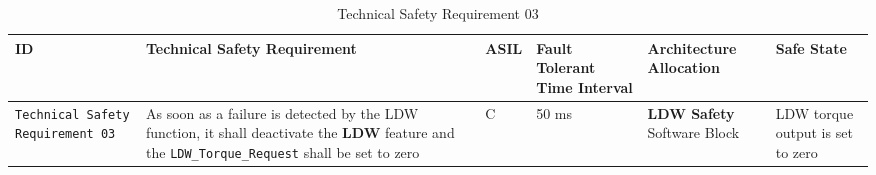 \begin{table}[!htpb]
\caption{Technical Safety Requirement 03}
\begin{center}
\scriptsize
\renewcommand{\arraystretch}{1.4}
\begin{tabular}{ L{1.8cm}|L{5.2cm}|L{0.7cm}|L{1.3cm}|L{1.8cm}|L{2.0cm}  }
\hline
{}
ID &
Technical Safety Requirement  &
ASIL &
Fault Tolerant Time Interval  &  
Architecture Allocation  &  
Safe State \\\hline
\textcolor{harmonia-blue}{\texttt{Technical Safety Requirement 03}}  &
As soon as a failure is detected by the LDW function, it shall
deactivate the \textbf{LDW} feature and the 
\textcolor{dark-red}{\texttt{LDW\_Torque\_Request}}
shall be set to zero
   &
C &
50 ms  &
  \textbf{LDW Safety} Software Block  &
LDW torque output is set to zero
\\\hline
\end{tabular}
\end{center}
\label{tab:tr03}
\end{table}


